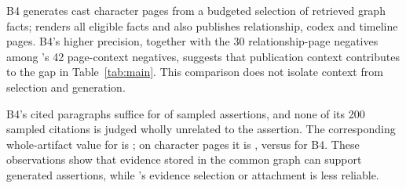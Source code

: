 B4 generates cast character pages from a budgeted selection of retrieved graph facts;
\sys renders all eligible facts and also publishes relationship, codex and timeline
pages. B4's higher precision, together with the 30 relationship-page negatives among
\sys's 42 page-context negatives, suggests that publication context contributes to
the gap in Table~\ref{tab:main}. This comparison does not isolate context from selection
and generation.

B4's cited paragraphs suffice for  of sampled assertions, and none
of its 200 sampled citations is judged wholly unrelated to the assertion.
The corresponding whole-artifact value for \sys is ;
on character pages it is , versus  for B4.
These observations show that evidence stored in the common graph can support generated
assertions, while \sys's evidence selection or attachment is less reliable.

